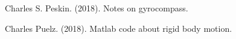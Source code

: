 \documentclass[12pt]{article}
\renewcommand{\(}{\left (}
\renewcommand{\)}{\right )}
\renewcommand{\vec}[1]{\boldsymbol{#1}}
\begin{document}

\begin{thebibliography}{9}

	Charles S. Peskin. (2018).
	Notes on gyrocompass.

	Charles Puelz. (2018).
	Matlab code about rigid body motion.




\end{thebibliography}
\end{document}
